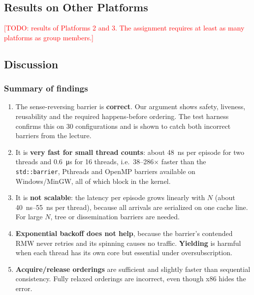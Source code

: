 \subsection{Results on Other Platforms}
\label{sec:ex2-other}

\textcolor{red}{[TODO: results of Platforms 2 and 3. The assignment requires
at least as many platforms as group members.]}

\subsection{Discussion}
\label{sec:ex2-discussion}

\subsubsection{Summary of findings}

\begin{enumerate}
    \item The sense-reversing barrier is \textbf{correct}. Our argument
          shows safety, liveness, reusability and the required
          happens-before ordering. The test harness confirms this on 30
          configurations and is shown to catch both incorrect barriers from
          the lecture.
    \item It is \textbf{very fast for small thread counts}: about
          \SI{48}{\nano\second} per episode for two threads and
          \SI{0.6}{\micro\second} for 16 threads, i.e.\ 38--286$\times$
          faster than the \texttt{std::barrier}, Pthreads and OpenMP
          barriers available on Windows/MinGW, all of which block in the
          kernel.
    \item It is \textbf{not scalable}: the latency per episode grows
          linearly with $N$ (about \SIrange{40}{55}{\nano\second} per
          thread), because all arrivals are serialized on one cache line.
          For large $N$, tree or dissemination barriers are needed.
    \item \textbf{Exponential backoff does not help}, because the barrier's
          contended RMW never retries and its spinning causes no traffic.
          \textbf{Yielding} is harmful when each thread has its own core
          but essential under oversubscription.
    \item \textbf{Acquire/release orderings} are sufficient and slightly
          faster than sequential consistency. Fully relaxed orderings are
          incorrect, even though x86 hides the error.
\end{enumerate}

